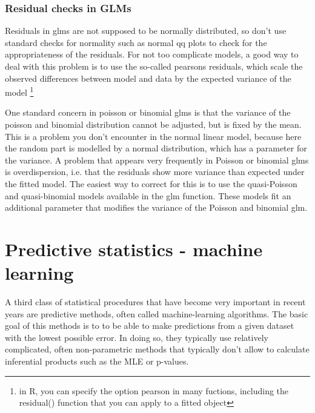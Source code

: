 \documentclass[a4paper,twoside]{tufte-book}\usepackage[]{graphicx}\usepackage[]{color}
\begin{document}
{\begin{fullwidth}
\begin{mdframed}
\end{mdframed}
\end{fullwidth} 


\subsection{Residual checks in GLMs}

Residuals in glms are not supposed to be normally distributed, so don't use standard checks for normality such as normal qq plots to check for the appropriateness of the residuals. For not too complicate models, a good way to deal with this problem is to use the so-called pearsons residuals, which scale the observed differences between model and data by the expected variance of the model \footnote{in R, you can specify the option pearson in many fuctions, including the residual() function that you can apply to a fitted object}

One standard concern in poisson or binomial glms is that the variance of the poisson and binomial distribution cannot be adjusted, but is fixed by the mean. This is a problem you don't encounter in the normal linear model, because here the random part is modelled by a normal distribution, which has a parameter for the variance. A problem that appears very frequently in Poisson or binomial glms is overdispersion, i.e. that the residuals show more variance than expected under the fitted model.  The easiest way to correct for this is to use the quasi-Poisson and quasi-binomial models available in the glm function. These models fit an additional parameter that modifies the variance of the Poisson and binomial glm. 


\chapter{Predictive statistics - machine learning}

A third class of statistical procedures that have become very important in recent years are predictive methods, often called machine-learning algorithms. The basic goal of this methods is to to be able to make predictions from a given dataset with the lowest possible error. In doing so, they typically use relatively complicated, often non-parametric methods that typically don't allow to calculate inferential products such as the MLE or p-values.

}
\end{document}
